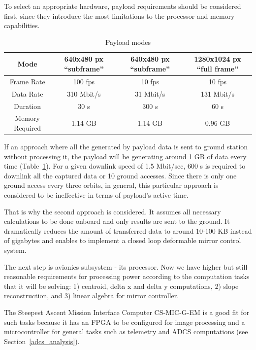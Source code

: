 \documentclass[12pt]{article}
\begin{document}
To select an appropriate hardware, payload requirements should be considered first, since they introduce the most limitations to the processor and memory capabilities.

\begin{table}[ht]
\caption{Payload modes}
\label{table:avionics_modes}
\begin{center}
    \begin{tabular}{| c || c | c | c |} \hline
    	Mode & 640x480 px ``subframe'' &  640x480 px ``subframe'' & 1280x1024 px  ``full frame'' \\ \hline \hline
    Frame Rate & 100 fps & 10 fps & 10 fps \\ \hline
    Data Rate & 310 Mbit/s & 31 Mbit/s & 131 Mbit/s \\ \hline
    Duration & 30 s & 300 s & 60 s \\ \hline
    Memory Required & 1.14 GB & 1.14 GB & 0.96 GB \\ \hline 
    \end{tabular}
\end{center}
\end{table}

If an approach where all the generated by payload data is sent to ground station without processing it, the payload will be generating around 1 GB of data every time (Table~\ref{table:avionics_modes}). For a given downlink speed of 1.5 Mbit/sec, 600 s is required to downlink all the captured data or 10 ground accesses. Since there is only one ground access every three orbits, in general, this particular approach is considered to be ineffective in terms of payload’s active time.

That is why the second approach is considered. It assumes all necessary calculations to be done onboard and only results are sent to the ground. It dramatically reduces the amount of transferred data to around 10-100 KB instead of gigabytes and enables to implement a closed loop deformable mirror control system.

The next step is avionics subsystem - its processor. Now we have higher but still reasonable requirements for processing power according to the computation tasks that it will be solving:
1) centroid, delta x and delta y computations, 2) slope reconstruction, and 3) linear algebra for mirror controller.

The Steepest Ascent Mission Interface Computer CS-MIC-G-EM is a good fit for such tasks because it has an FPGA to be configured for image processing and a microcontroller for general tasks such as telemetry and ADCS computations (see Section~\ref{adcs_analysis}).
\end{document}
